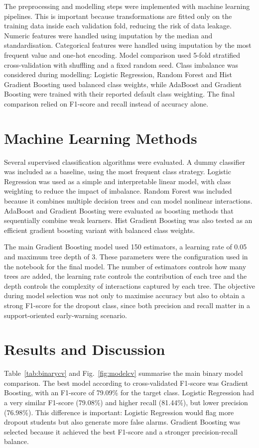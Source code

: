\documentclass[conference]{IEEEtran}
\begin{document}
The preprocessing and modelling steps were implemented with machine learning pipelines. This is important because transformations are fitted only on the training data inside each validation fold, reducing the risk of data leakage. Numeric features were handled using imputation by the median and standardisation. Categorical features were handled using imputation by the most frequent value and one-hot encoding. Model comparison used 5-fold stratified cross-validation with shuffling and a fixed random seed. Class imbalance was considered during modelling: Logistic Regression, Random Forest and Hist Gradient Boosting used balanced class weights, while AdaBoost and Gradient Boosting were trained with their reported default class weighting. The final comparison relied on F1-score and recall instead of accuracy alone.


\section{Machine Learning Methods}
Several supervised classification algorithms were evaluated. A dummy classifier was included as a baseline, using the most frequent class strategy. Logistic Regression was used as a simple and interpretable linear model, with class weighting to reduce the impact of imbalance. Random Forest was included because it combines multiple decision trees and can model nonlinear interactions. AdaBoost and Gradient Boosting were evaluated as boosting methods that sequentially combine weak learners. Hist Gradient Boosting was also tested as an efficient gradient boosting variant with balanced class weights.

The main Gradient Boosting model used 150 estimators, a learning rate of 0.05 and maximum tree depth of 3. These parameters were the configuration used in the notebook for the final model. The number of estimators controls how many trees are added, the learning rate controls the contribution of each tree and the depth controls the complexity of interactions captured by each tree. The objective during model selection was not only to maximise accuracy but also to obtain a strong F1-score for the dropout class, since both precision and recall matter in a support-oriented early-warning scenario.

\section{Results and Discussion}
Table~\ref{tab:binarycv} and Fig.~\ref{fig:modelcv} summarise the main binary model comparison. The best model according to cross-validated F1-score was Gradient Boosting, with an F1-score of 79.09\% for the target class. Logistic Regression had a very similar F1-score (79.08\%) and higher recall (81.44\%), but lower precision (76.98\%). This difference is important: Logistic Regression would flag more dropout students but also generate more false alarms. Gradient Boosting was selected because it achieved the best F1-score and a stronger precision-recall balance.
\end{document}
